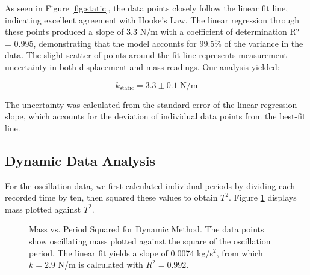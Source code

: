 \documentclass[12pt]{article}
\begin{document}
As seen in Figure \ref{fig:static}, the data points closely follow the linear fit line, indicating excellent agreement with Hooke's Law. The linear regression through these points produced a slope of 3.3 N/m with a coefficient of determination R² = 0.995, demonstrating that the model accounts for 99.5\% of the variance in the data. The slight scatter of points around the fit line represents measurement uncertainty in both displacement and mass readings. Our analysis yielded:

\begin{equation}
k_{\text{static}} = 3.3 \pm 0.1 \text{ N/m}
\label{eq:result_static}
\end{equation}

The uncertainty was calculated from the standard error of the linear regression slope, which accounts for the deviation of individual data points from the best-fit line.

\subsection*{Dynamic Data Analysis}

For the oscillation data, we first calculated individual periods by dividing each recorded time by ten, then squared these values to obtain $T^2$. Figure \ref{fig:dynamic} displays mass plotted against $T^2$.

\begin{figure}[H]
\centering
{}
\caption{Mass vs. Period Squared for Dynamic Method. The data points show oscillating mass plotted against the square of the oscillation period. The linear fit yields a slope of 0.0074 kg/s$^2$, from which $k = 2.9$ N/m is calculated with $R^2 = 0.992$.}
\label{fig:dynamic}
\end{figure}
\end{document}
